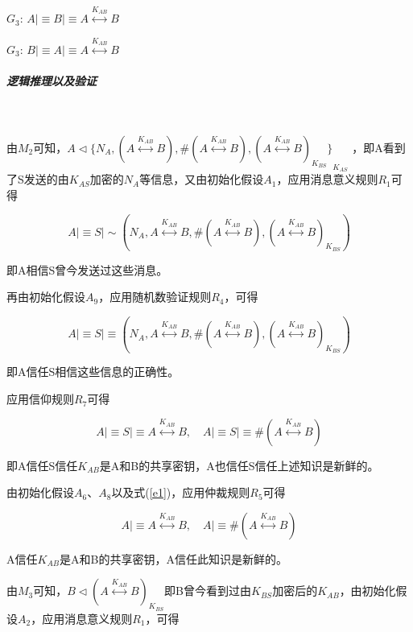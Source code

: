 \documentclass[cs4size,a4pape,UTF8]{ctexart}
\numberwithin{equation}{section}
\numberwithin{table}{section}
\numberwithin{figure}{section}
\begin{document}
$G_{3}$: $A{\lvert\equiv}B{\lvert\equiv}A\stackrel{K_{AB}}{\longleftrightarrow}B$

$G_{3}$: $B{\lvert\equiv}A{\lvert\equiv}A\stackrel{K_{AB}}{\longleftrightarrow}B$

\subparagraph{逻辑推理以及验证}\

由$M_{2}$可知，$A\triangleleft{\{N_{A},(A\stackrel{K_{AB}}{\longleftrightarrow}B),\#(A\stackrel{K_{AB}}{\longleftrightarrow}B),{(A\stackrel{K_{AB}}{\longleftrightarrow}B)}_{K_{BS}}\}}_{K_{AS}}$ ，即A看到了S发送的由$K_{AS}$加密的$N_{A}$等信息，又由初始化假设$A_{1}$，应用消息意义规则$R_{1}$可得

\begin{equation}
A{\lvert\equiv}S{\lvert\sim}(N_{A},A\stackrel{K_{AB}}{\longleftrightarrow}B,\#(A\stackrel{K_{AB}}{\longleftrightarrow}B),{(A\stackrel{K_{AB}}{\longleftrightarrow}B)}_{K_{BS}})
\end{equation}

即A相信S曾今发送过这些消息。

再由初始化假设$A_{9}$，应用随机数验证规则$R_{4}$，可得

\begin{equation}
A{\lvert\equiv}S{\lvert\equiv}(N_{A},A\stackrel{K_{AB}}{\longleftrightarrow}B,\#(A\stackrel{K_{AB}}{\longleftrightarrow}B),{(A\stackrel{K_{AB}}{\longleftrightarrow}B)}_{K_{BS}})
\end{equation}

即A信任S相信这些信息的正确性。

应用信仰规则$R_{7}$可得

\begin{equation}
A{\lvert\equiv}S{\lvert\equiv}A\stackrel{K_{AB}}{\longleftrightarrow}B,{\quad}A{\lvert\equiv}S{\lvert\equiv}\#(A\stackrel{K_{AB}}{\longleftrightarrow}B)\label{e1}
\end{equation}

即A信任S信任$K_{AB}$是A和B的共享密钥，A也信任S信任上述知识是新鲜的。

由初始化假设$A_{6}$、$A_{8}$以及式(\ref{e1})，应用仲裁规则$R_{5}$可得

\begin{equation}
A{\lvert\equiv}A\stackrel{K_{AB}}{\longleftrightarrow}B,{\quad}A{\lvert\equiv}\#(A\stackrel{K_{AB}}{\longleftrightarrow}B)\label{e2}
\end{equation}

A信任$K_{AB}$是A和B的共享密钥，A信任此知识是新鲜的。

由$M_{3}$可知，$B\triangleleft{(A\stackrel{K_{AB}}{\longleftrightarrow}B)}_{K_{BS}}$即B曾今看到过由$K_{BS}$加密后的$K_{AB}$，由初始化假设$A_{2}$，应用消息意义规则$R_{1}$，可得
\end{document}
